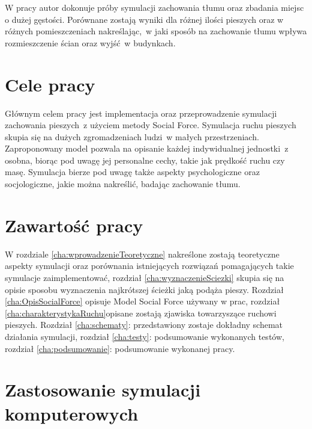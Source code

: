 W pracy autor dokonuje próby symulacji zachowania tłumu oraz zbadania miejsc o dużej gęstości. Porównane zostają wyniki dla różnej ilości pieszych oraz w różnych pomieszczeniach nakreślając,~w jaki sposób na zachowanie tłumu wpływa rozmieszczenie ścian oraz wyjść~w budynkach.



\section{Cele pracy}
\label{sec:celePracy}

Głównym celem pracy jest implementacja oraz przeprowadzenie symulacji zachowania pieszych~z użyciem metody Social Force. Symulacja ruchu pieszych skupia się na dużych zgromadzeniach ludzi~w małych przestrzeniach. Zaproponowany model pozwala na opisanie każdej indywidualnej jednostki~z osobna, biorąc pod uwagę jej personalne cechy, takie jak prędkość ruchu czy masę. Symulacja bierze pod uwagę także aspekty psychologiczne oraz socjologiczne, jakie można nakreślić, badając zachowanie tłumu.


\section{Zawartość pracy}
\label{sec:zawartoscPracy}
W rozdziale \ref{cha:wprowadzenieTeoretyczne} nakreślone zostają teoretyczne aspekty symulacji oraz porównania istniejących rozwiązań pomagających takie symulacje zaimplementować, rozdział \ref{cha:wyznaczenieSciezki} skupia się na opisie sposobu wyznaczenia najkrótszej ścieżki jaką podąża pieszy. Rozdział \ref{cha:OpisSocialForce} opisuje Model Social Force używany w prac, rozdział \ref{cha:charakterystykaRuchu}opisane zostają zjawiska towarzyszące ruchowi pieszych. Rozdział \ref{cha:schematy}: przedstawiony zostaje dokładny schemat działania symulacji, rozdział \ref{cha:testy}: podsumowanie wykonanych testów, rozdział \ref{cha:podsumowanie}: podsumowanie wykonanej pracy. \\


\section{Zastosowanie symulacji komputerowych}
\label{sec:ZastosowanieSymulacji}

